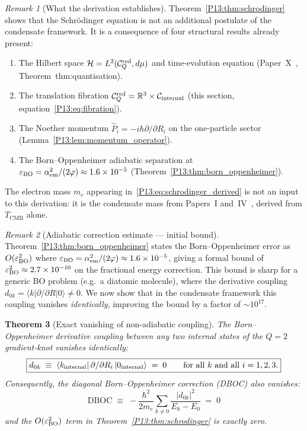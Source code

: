 \documentclass[11pt,a4paper]{article}
\newtheorem{theorem}{Theorem}[section]
\theoremstyle{definition}
\theoremstyle{remark}
\newtheorem{remark}[theorem]{Remark}
\newcommand{\vp}{\varphi}
\newcommand{\TCMB}{T_{\mathrm{CMB}}}
\newcommand{\aem}{\alpha_{\mathrm{em}}}
\newcommand{\eps}{\varepsilon}
\begin{document}
\begin{remark}[What the derivation establishes]
\label{P13:rem:what_derived}
Theorem~\ref{P13:thm:schrodinger} shows that the Schr\"odinger equation
is not an additional postulate of the condensate framework.
It is a consequence of four structural results already present:
\begin{enumerate}[noitemsep]
  \item The Hilbert space $\mathcal{H}=L^2(\mathcal{C}_Q^{\rm red},d\mu)$
    and time-evolution equation (Paper~X~\cite{Paper10}, Theorem~thm:quantisation).
  \item The translation fibration $\mathcal{C}_Q^{\rm red}=\mathbb{R}^3\times
    \mathcal{C}_{\rm internal}$ (this section, equation~\eqref{P13:eq:fibration}).
  \item The Noether momentum $\hat{P}_i=-i\hbar\partial/\partial R_i$
    on the one-particle sector (Lemma~\ref{P13:lem:momentum_operator}).
  \item The Born--Oppenheimer adiabatic separation at
    $\eps_{\rm BO}=\aem^2/(2\vp)\approx1.6\times10^{-5}$
    (Theorem~\ref{P13:thm:born_oppenheimer}).
\end{enumerate}
The electron mass $m_e$ appearing in~\eqref{P13:eq:schrodinger_derived}
is not an input to this derivation: it is the condensate mass
from Papers~I and~IV~\cite{Paper1,Paper4}, derived from $\TCMB$ alone.
\end{remark}

\begin{remark}[Adiabatic correction estimate — initial bound]
\label{P13:rem:BO_correction}
Theorem~\ref{P13:thm:born_oppenheimer} states the Born--Oppenheimer error as
$O(\eps_{\rm BO}^2)$ where $\eps_{\rm BO}=\aem^2/(2\vp)\approx1.6\times10^{-5}$,
giving a formal bound of $\eps_{\rm BO}^2\approx2.7\times10^{-10}$
on the fractional energy correction.
This bound is sharp for a generic BO problem (e.g.\ a diatomic molecule),
where the derivative coupling $d_{0k}=\langle k|\partial/\partial R|0\rangle\neq0$.
We now show that in the condensate framework this coupling vanishes
\emph{identically}, improving the bound by a factor of $\sim10^{17}$.
\end{remark}

\begin{theorem}[Exact vanishing of non-adiabatic coupling]
\label{P13:thm:NA_vanishing}
The Born--Oppenheimer derivative coupling between any two internal states
of the $Q=2$ gradient-knot vanishes identically:
\begin{equation}
  \boxed{d_{0k} \;\equiv\; \langle k_{\rm internal}|\,\partial/\partial R_i\,|0_{\rm internal}\rangle
  \;=\; 0
  \qquad \text{for all } k \text{ and all } i=1,2,3.}
  \label{P13:eq:d0k_zero}
\end{equation}
Consequently, the diagonal Born--Oppenheimer correction (DBOC) also vanishes:
\begin{equation}
  \mathrm{DBOC}
  \;\equiv\; -\frac{\hbar^2}{2m_e}\sum_{k\neq0}\frac{|d_{0k}|^2}{E_k-E_0}
  \;=\; 0
  \label{P13:eq:DBOC_zero}
\end{equation}
and the $O(\eps_{\rm BO}^2)$ term in Theorem~\ref{P13:thm:schrodinger}
is exactly zero.
\end{theorem}
\end{document}
